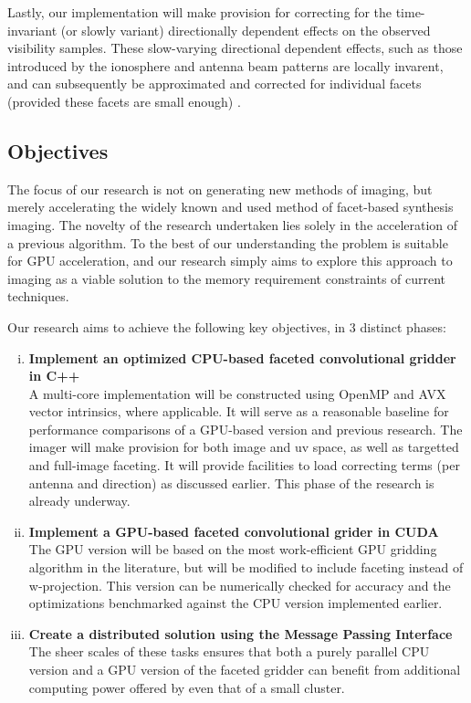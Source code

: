 \documentclass[a4paper, two column]{article}
\begin{document}
Lastly, our implementation will make provision for correcting for the time-invariant (or slowly variant) directionally dependent effects on the observed visibility samples. 
These slow-varying directional dependent effects, such as those introduced by the ionosphere and antenna beam patterns are locally invarent, and can subsequently be approximated and corrected for 
individual facets (provided these facets are small enough) \cite{2011A&A...527A.106S,2011A&A...527A.107S}.

\subsection{Objectives}
The focus of our research is not on generating new methods of imaging, but merely accelerating the widely known and used method of facet-based synthesis imaging. The novelty of the research undertaken 
lies solely in the acceleration of a previous algorithm. To the best of our understanding the problem is suitable for GPU acceleration, and our research simply aims to explore this approach to imaging 
as a viable solution to the memory requirement constraints of current techniques.

Our research aims to achieve the following key objectives, in 3 distinct phases:
\begin{enumerate}[i)]
 \item \textbf{Implement an optimized CPU-based faceted convolutional gridder in C++}\\
  A multi-core implementation will be constructed using OpenMP and AVX vector intrinsics, where applicable. It will serve as a reasonable baseline for performance 
  comparisons of a GPU-based version and previous research. The imager will make provision for both image and uv space, as well as targetted and full-image faceting. It will 
  provide facilities to load correcting terms (per antenna and direction) as discussed earlier. This phase of the research is already underway.
 \item \textbf{Implement a GPU-based faceted convolutional grider in CUDA}\\
  The GPU version will be based on the most work-efficient GPU gridding algorithm in the literature, but will be modified to include faceting instead of w-projection. This version
  can be numerically checked for accuracy and the optimizations benchmarked against the CPU version implemented earlier.
 \item \textbf{Create a distributed solution using the Message Passing Interface}\\
  The sheer scales of these tasks ensures that both a purely parallel CPU version and a GPU version of the faceted gridder can benefit from additional computing power offered by even that of a small cluster.
\end{enumerate}
\end{document}
